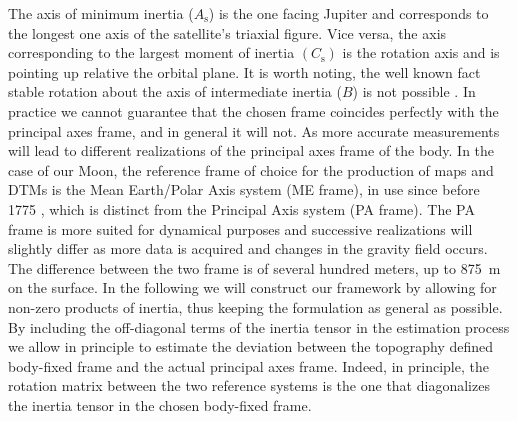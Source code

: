 \documentclass[pdflatex,sn-mathphys-num]{sn-jnl}%
\theoremstyle{thmstyleone}%
\theoremstyle{thmstyletwo}%
\theoremstyle{thmstylethree}%
\begin{document}
The axis of minimum inertia ($A_\mathrm{s}$) is the one facing Jupiter and corresponds to the longest one axis of the satellite's triaxial figure. Vice versa, the axis corresponding to the largest moment of inertia $(C_\mathrm{s})$ is the rotation axis and is pointing up relative the orbital plane. 
It is worth noting, the well known fact stable rotation about the axis of intermediate inertia ($B$) is not possible \citep[see, e.g.,][]{goldstein2002}.
%
In practice we cannot guarantee that the chosen frame coincides perfectly with the principal axes frame, and in general it will not. As more accurate measurements will lead to different realizations of the principal axes frame of the body. 
%
In the case of our Moon, the reference frame of choice for the production of maps and DTMs is the Mean Earth/Polar Axis system (ME frame), in use since before 1775 \citep[see, e.g.,][]{2000JGR...10520277D}, which is distinct from the Principal Axis system (PA frame). The PA frame is more suited for dynamical purposes and successive realizations will slightly differ as more data is acquired and changes in the gravity field occurs. The difference between the two frame is of several hundred meters, up to \SI{875}{m} on the surface. %
In the following we will construct our framework by allowing for non-zero products of inertia, thus keeping the formulation as general as possible.
By including the off-diagonal terms of the inertia tensor in the estimation process we allow in principle to estimate the deviation between the topography defined body-fixed frame and the actual principal axes frame. Indeed, in principle, the rotation matrix between the two reference systems is the one that diagonalizes the inertia tensor in the chosen body-fixed frame.
\end{document}
